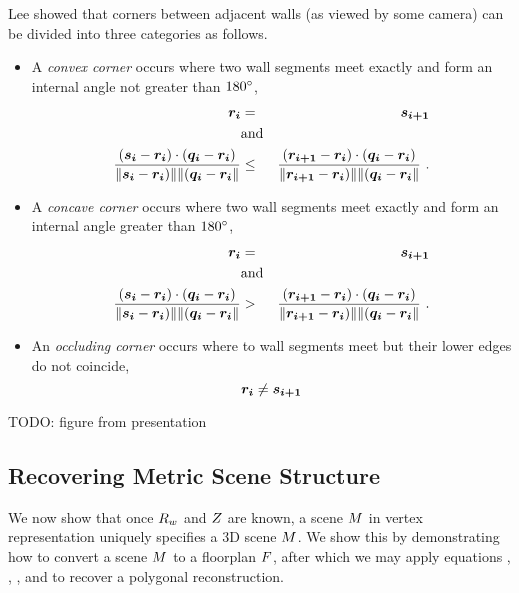 Lee \etal \cite{Lee09} showed that corners between adjacent walls
(as viewed by some camera) can be divided into three categories as follows.
\begin{itemize}
  \item{A \textit{convex corner} occurs where two wall segments meet
    exactly and form an internal angle not greater than $180\degrees$, \ie
    \begin{eqnarray}
      \vect{r_i} &=& \vect{s_{i+1}}\\
      &\mbox{and}&\\
      \frac{(\vect{s_i}-\vect{r_i})\cdot(\vect{q_i}-\vect{r_i})}
           {\|\vect{s_i}-\vect{r_i})\|\|(\vect{q_i}-\vect{r_i}\|}
      &\leq&
      \frac{(\vect{r_{i+1}}-\vect{r_i})\cdot(\vect{q_i}-\vect{r_i})}
           {\|\vect{r_{i+1}}-\vect{r_i})\|\|(\vect{q_i}-\vect{r_i}\|} ~.
    \end{eqnarray}
  }
  \item{A \textit{concave corner} occurs where two wall segments meet
    exactly and form an internal angle greater than $180\degrees$, \ie
    \begin{eqnarray}
      \vect{r_i} &=& \vect{s_{i+1}}\\
      &\mbox{and}&\\
      \frac{(\vect{s_i}-\vect{r_i})\cdot(\vect{q_i}-\vect{r_i})}
           {\|\vect{s_i}-\vect{r_i})\|\|(\vect{q_i}-\vect{r_i}\|}
      &>&
      \frac{(\vect{r_{i+1}}-\vect{r_i})\cdot(\vect{q_i}-\vect{r_i})}
           {\|\vect{r_{i+1}}-\vect{r_i})\|\|(\vect{q_i}-\vect{r_i}\|} ~.
    \end{eqnarray}
  }
  \item{An \textit{occluding corner} occurs where to wall segments
    meet but their lower edges do not coincide, \ie
    \begin{equation}
      \vect{r_i} \neq \vect{s_{i+1}}
    \end{equation}
  }
\end{itemize}
TODO: figure from presentation

\subsection{Recovering Metric Scene Structure}
\label{sec:metric-recovery}

We now show that once $\SceneR$ and $\Zs$ are known, a scene $\Scene$
in vertex representation uniquely specifies a 3D scene
$\Reconstruction$. We show this by demonstrating how to convert a
scene $\Scene$ to a floorplan $\Floorplan$, after which we may apply
equations , , , and  to
recover a polygonal reconstruction.

